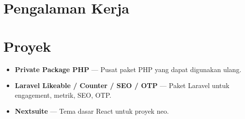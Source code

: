 \documentclass[11pt,a4paper]{article}
\begin{document}

\section*{Pengalaman Kerja}

\section*{Proyek}
\begin{itemize}
  \item \textbf{Private Package PHP} --- Pusat paket PHP yang dapat digunakan ulang.
  \item \textbf{Laravel Likeable / Counter / SEO / OTP} --- Paket Laravel untuk engagement, metrik, SEO, OTP.
  \item \textbf{Nextsuite} --- Tema dasar React untuk proyek neo.
\end{itemize}

\end{document}
